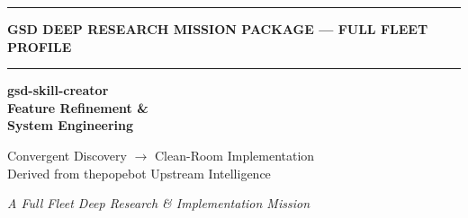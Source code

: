 \documentclass[11pt,letterpaper]{article}
\begin{document}
\thispagestyle{empty}
\begin{center}
\vspace*{1.8cm}

\textcolor{bordergray}{\rule{\textwidth}{0.4pt}}
\vspace{0.3cm}

{\small\sffamily\textcolor{primary}{\textbf{GSD DEEP RESEARCH MISSION PACKAGE --- FULL FLEET PROFILE}}}

\vspace{0.3cm}
\textcolor{bordergray}{\rule{\textwidth}{0.4pt}}

\vspace{1.2cm}
{\fontsize{28}{34}\selectfont\bfseries\sffamily\textcolor{primary}{gsd-skill-creator\\[0.3em]Feature Refinement \&\\[0.3em]System Engineering}}

\vspace{0.8cm}
{\Large\sffamily\textcolor{secondary}{Convergent Discovery $\rightarrow$ Clean-Room Implementation\\Derived from thepopebot Upstream Intelligence}}

\vspace{0.5cm}
{\large\sffamily\itshape\textcolor{tertiary}{A Full Fleet Deep Research \& Implementation Mission}}

\vspace{1.8cm}


\end{center}
\end{document}
